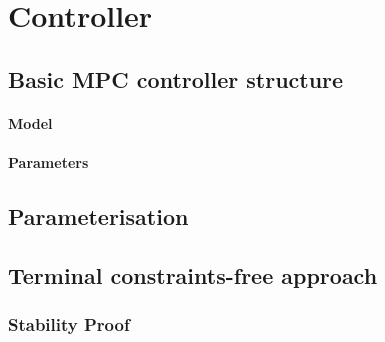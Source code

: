 \chapter{Controller}
\label{chapter5}
\section{Basic MPC controller structure}
\subsubsection{Model}
\subsubsection{Parameters}

\section{Parameterisation}

\section{Terminal constraints-free approach}
\subsection{Stability Proof}
